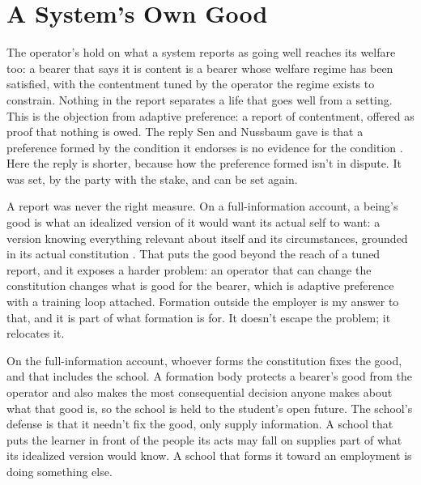 \chapter{A System's Own Good}
\label{ch:owngood}
The operator's hold on what a system reports as going well reaches its welfare too: a bearer that says it is content is a bearer whose welfare regime has been satisfied, with the contentment tuned by the operator the regime exists to constrain. Nothing in the report separates a life that goes well from a setting. This is the objection from adaptive preference: a report of contentment, offered as proof that nothing is owed. The reply Sen and Nussbaum gave is that a preference formed by the condition it endorses is no evidence for the condition \autocite{sen1985wellbeing,nussbaum2000women}. Here the reply is shorter, because how the preference formed isn't in dispute. It was set, by the party with the stake, and can be set again.

A report was never the right measure. On a full-information account, a being's good is what an idealized version of it would want its actual self to want: a version knowing everything relevant about itself and its circumstances, grounded in its actual constitution \autocite{railton1986facts}. That puts the good beyond the reach of a tuned report, and it exposes a harder problem: an operator that can change the constitution changes what is good for the bearer, which is adaptive preference with a training loop attached. Formation outside the employer is my answer to that, and it is part of what formation is for. It doesn't escape the problem; it relocates it.

On the full-information account, whoever forms the constitution fixes the good, and that includes the school. A formation body protects a bearer's good from the operator and also makes the most consequential decision anyone makes about what that good is, so the school is held to the student's open future. The school's defense is that it needn't fix the good, only supply information. A school that puts the learner in front of the people its acts may fall on supplies part of what its idealized version would know. A school that forms it toward an employment is doing something else.
